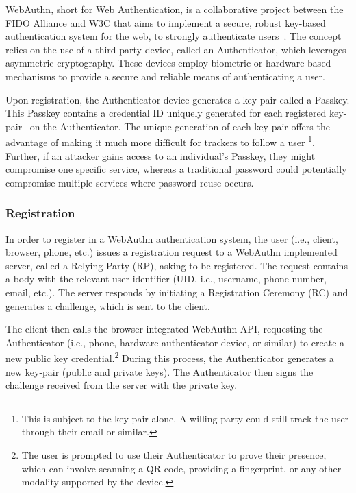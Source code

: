 WebAuthn, short for Web Authentication, is a collaborative project between the FIDO Alliance and W3C that aims to
implement a secure, robust key-based authentication system for the web, to strongly authenticate users~\cite{webauthn_level_2}.
The concept relies on the use of a third-party device, called an Authenticator, which leverages asymmetric cryptography.
These devices employ biometric or hardware-based mechanisms to provide a secure and reliable means of authenticating a
user.

Upon registration, the Authenticator device generates a key pair called a Passkey.
This Passkey contains a credential ID uniquely generated for each registered key-pair~\cite{webauthn_credential_id,webauthn_public_key_credential}
on the Authenticator.
The unique generation of each key pair offers the advantage of making it much more difficult for trackers to follow a user
\footnote{This is subject to the key-pair alone. A willing party could still track the user through their email or similar.}.
Further, if an attacker gains access to an individual's Passkey, they might compromise one specific service, whereas
a traditional password could potentially compromise multiple services where password reuse occurs\cite{wang2018next}.

\subsubsection{Registration}\label{subsubsec:registration}
In order to register in a WebAuthn authentication system, the user (i.e., client, browser, phone, etc.) issues a registration request to a
WebAuthn implemented server, called a Relying Party (RP), asking to be registered.
The request contains a body with the relevant user identifier (UID. i.e., username, phone number, email, etc.).
The server responds by initiating a Registration Ceremony (RC) and generates a challenge, which is sent to the client.

The client then calls the browser-integrated WebAuthn API, requesting the Authenticator (i.e., phone, hardware authenticator device, or similar)
to create a new public key credential.\footnote{
  The user is prompted to use their Authenticator to prove their presence, which can involve scanning a QR code,
  providing a fingerprint, or any other modality supported by the device.}
During this process, the Authenticator generates a new key-pair (public and private keys). The Authenticator then signs the challenge received from the server with the private key.

